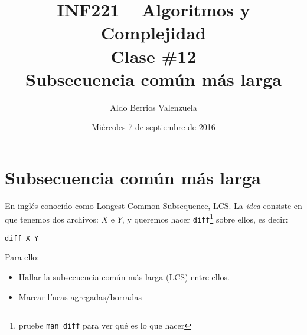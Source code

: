 \documentclass[english, spanish, fleqn, 10pt]{article}
\author{Aldo Berrios Valenzuela}
\title{INF221 -- Algoritmos y Complejidad\\[.4\baselineskip]Clase \#12\\Subsecuencia común más larga}
\date{Miércoles 7 de septiembre de 2016}
\numberwithin{equation}{section}
\theoremstyle{definition}
\begin{document}
\maketitle
\section{Subsecuencia común más larga}
En inglés conocido como Longest Common Subsequence, LCS. La \emph{idea} consiste en que tenemos dos archivos: $X$ e $Y$, y queremos hacer \texttt{diff}\footnote{pruebe \texttt{man diff} para ver qué es lo que hacer} sobre ellos, es decir:
\begin{lstlisting}
diff X Y
\end{lstlisting}
Para ello:
\begin{itemize}
	\item Hallar la subsecuencia común más larga (LCS) entre ellos.
	\item Marcar líneas agregadas/borradas
\end{itemize}
\end{document}
